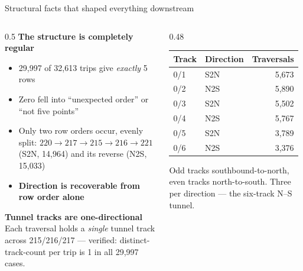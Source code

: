 \documentclass[aspectratio=169,10pt]{beamer}
\newcommand{\srcnote}[1]{{\scriptsize\color{ink3}#1}}
\newcommand{\hl}[1]{{\color{corange}\textbf{#1}}}
\begin{document}
\begin{frame}{Structural facts that shaped everything downstream}
  \begin{columns}[T]
    \begin{column}{0.5\textwidth}
      \textbf{The structure is completely regular}
      \begin{itemize}\small
        \item 29{,}997 of 32{,}613 trips give \emph{exactly} 5 rows
        \item Zero fell into ``unexpected order'' or ``not five points''
        \item Only two row orders occur, evenly split:
          $220\!\to\!217\!\to\!215\!\to\!216\!\to\!221$ (S2N, 14{,}964) and its
          reverse (N2S, 15{,}033)
        \item \hl{Direction is recoverable from row order alone}
      \end{itemize}
      \vspace{0.6em}
      \textbf{Tunnel tracks are one-directional}\\[0.3em]
      \srcnote{Each traversal holds a \emph{single} tunnel track across
      215/216/217 --- verified: distinct-track-count per trip is 1 in all 29{,}997 cases.}
    \end{column}
    \begin{column}{0.48\textwidth}
      \centering\small
      \begin{tabular}{@{}llr@{}}
        \toprule
        Track & Direction & Traversals \\
        \midrule
        0/1 & S2N & 5{,}673 \\
        0/2 & N2S & 5{,}890 \\
        0/3 & S2N & 5{,}502 \\
        0/4 & N2S & 5{,}767 \\
        0/5 & S2N & 3{,}789 \\
        0/6 & N2S & 3{,}376 \\
        \bottomrule
      \end{tabular}
      \vspace{1em}

      \raggedright\srcnote{Odd tracks southbound-to-north, even tracks
      north-to-south. Three per direction --- the six-track N--S tunnel.}
    \end{column}
  \end{columns}
\end{frame}
\end{document}
